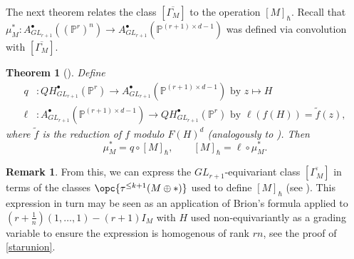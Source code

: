 \documentclass[12pt]{amsart}
\newcommand{\mb}{\mathbb}
\newcommand{\ol}{\overline}
\newcommand{\pt}{{\rm pt}}
\theoremstyle{plain}
\newtheorem{Thm*}{Theorem}
\theoremstyle{definition}
\newtheorem{Rem}[Thm]{Remark}
\theoremstyle{remark}
\begin{document}
The next theorem relates the class $[\ol{\Gamma_M}]$ to the operation $[M]_\hbar$. Recall that $\mu_M^*:A^\bullet_{GL_{r+1}}((\mb{P}^r)^n)\to A^\bullet_{GL_{r+1}}(\mb{P}^{(r+1)\times d-1})$ was defined via convolution with $[\overline{\Gamma_M}]$.
\begin{Thm*}[]\label{PFAintro}
Define 
\begin{align*}
    q&:QH^\bullet_{GL_{r+1}}(\mb{P}^r)\to A^\bullet_{GL_{r+1}}(\mb{P}^{(r+1)\times d-1})\text{ by }z \mapsto H\\
    \ell&:A^\bullet_{GL_{r+1}}(\mb{P}^{(r+1)\times d-1}) \to QH^\bullet_{GL_{r+1}}(\mb{P}^r)\text{ by }\ell(f(H))=\widetilde{f}(z),
\end{align*}
where $\widetilde{f}$ is the reduction of $f$ modulo $F(H)^d$ (analogously to ). Then
$$\mu_M^*=q\circ [M]_{\hbar},\qquad [M]_{\hbar}=\ell \circ \mu_M^*.$$
\end{Thm*}

\begin{Rem}
From this, we can express the $GL_{r+1}$-equivariant class $[\overline{\Gamma_M}]$ in terms of the classes $\opc{\tau^{\le k+1}(M \oplus \ast)}$ used to define $[M]_{\hbar}$ (see ). This expression in turn may be seen as an application of Brion's formula applied to $(r+\frac{1}{n})(1,\ldots,1) - (r+1)I_M$ with $H$ used non-equivariantly as a grading variable to ensure the expression is homogenous of rank $rn$, see the proof of \cref{starunion}.
\end{Rem}
\end{document}
